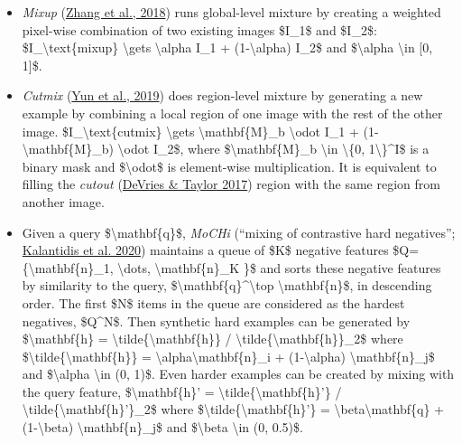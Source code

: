 \begin{itemize}
\tightlist
\item
  \emph{Mixup} (\href{https://arxiv.org/abs/1710.09412}{Zhang et al., 2018}) runs global-level mixture by creating a weighted pixel-wise combination of two existing images \$I\_1\$ and \$I\_2\$: \$I\_\textbackslash text\{mixup\} \textbackslash gets \textbackslash alpha I\_1 + (1-\textbackslash alpha) I\_2\$ and \$\textbackslash alpha \textbackslash in {[}0, 1{]}\$.
\item
  \emph{Cutmix} (\href{https://arxiv.org/abs/1905.04899}{Yun et al., 2019}) does region-level mixture by generating a new example by combining a local region of one image with the rest of the other image. \$I\_\textbackslash text\{cutmix\} \textbackslash gets \textbackslash mathbf\{M\}\_b \textbackslash odot I\_1 + (1-\textbackslash mathbf\{M\}\_b) \textbackslash odot I\_2\$, where \$\textbackslash mathbf\{M\}\_b \textbackslash in \textbackslash\{0, 1\textbackslash\}\^{}I\$ is a binary mask and \$\textbackslash odot\$ is element-wise multiplication. It is equivalent to filling the \emph{cutout} (\href{https://arxiv.org/abs/1708.04552}{DeVries \& Taylor 2017}) region with the same region from another image.
\item
  Given a query \$\textbackslash mathbf\{q\}\$, \emph{MoCHi} (``mixing of contrastive hard negatives''; \href{https://arxiv.org/abs/2010.01028}{Kalantidis et al. 2020}) maintains a queue of \$K\$ negative features \$Q=\{\textbackslash mathbf\{n\}\_1, \textbackslash dots, \textbackslash mathbf\{n\}\_K \}\$ and sorts these negative features by similarity to the query, \$\textbackslash mathbf\{q\}\^{}\textbackslash top \textbackslash mathbf\{n\}\$, in descending order. The first \$N\$ items in the queue are considered as the hardest negatives, \$Q\^{}N\$. Then synthetic hard examples can be generated by \$\textbackslash mathbf\{h\} = \textbackslash tilde\{\textbackslash mathbf\{h\}\} / \textbar\textbackslash tilde\{\textbackslash mathbf\{h\}\}\textbar\_2\$ where \$\textbackslash tilde\{\textbackslash mathbf\{h\}\} = \textbackslash alpha\textbackslash mathbf\{n\}\_i + (1-\textbackslash alpha) \textbackslash mathbf\{n\}\_j\$ and \$\textbackslash alpha \textbackslash in (0, 1)\$. Even harder examples can be created by mixing with the query feature, \$\textbackslash mathbf\{h\}' = \textbackslash tilde\{\textbackslash mathbf\{h\}'\} / \textbar\textbackslash tilde\{\textbackslash mathbf\{h\}'\}\textbar\_2\$ where \$\textbackslash tilde\{\textbackslash mathbf\{h\}'\} = \textbackslash beta\textbackslash mathbf\{q\} + (1-\textbackslash beta) \textbackslash mathbf\{n\}\_j\$ and \$\textbackslash beta \textbackslash in (0, 0.5)\$.
\end{itemize}

